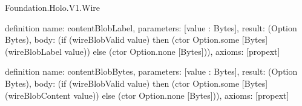 \begin{lexlean}{Foundation.Holo.V1.Wire}
\begin{semanticmodule}
definition{
  name: contentBlobLabel,
  parameters: [value : Bytes],
  result: (Option Bytes),
  body: (if (wireBlobValid value) then (ctor Option.some [Bytes] (wireBlobLabel value)) else (ctor Option.none [Bytes])),
  axioms: [propext]
}

definition{
  name: contentBlobBytes,
  parameters: [value : Bytes],
  result: (Option Bytes),
  body: (if (wireBlobValid value) then (ctor Option.some [Bytes] (wireBlobContent value)) else (ctor Option.none [Bytes])),
  axioms: [propext]
}
\end{semanticmodule}
\end{lexlean}
